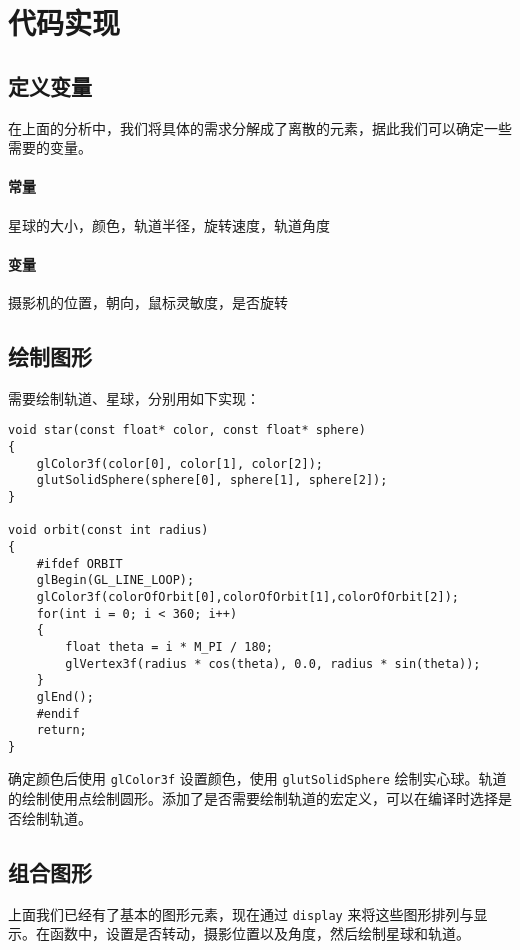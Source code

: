 \documentclass[12pt,hyperref,a4paper,UTF8]{ctexart}
\begin{document}
\section{代码实现}
\subsection{定义变量}
在上面的分析中，我们将具体的需求分解成了离散的元素，据此我们可以确定一些需要的变量。
\paragraph{常量}
星球的大小，颜色，轨道半径，旋转速度，轨道角度
\paragraph{变量}
摄影机的位置，朝向，鼠标灵敏度，是否旋转

\subsection{绘制图形}
需要绘制轨道、星球，分别用如下实现：
\begin{verbatim}
void star(const float* color, const float* sphere)
{
    glColor3f(color[0], color[1], color[2]);
    glutSolidSphere(sphere[0], sphere[1], sphere[2]);
}

void orbit(const int radius)
{
    #ifdef ORBIT
    glBegin(GL_LINE_LOOP);
    glColor3f(colorOfOrbit[0],colorOfOrbit[1],colorOfOrbit[2]);
    for(int i = 0; i < 360; i++)
    {
        float theta = i * M_PI / 180;
        glVertex3f(radius * cos(theta), 0.0, radius * sin(theta));
    }
    glEnd();
    #endif
    return;
}
\end{verbatim}

确定颜色后使用 \texttt{glColor3f} 设置颜色，使用 \texttt{glutSolidSphere} 绘制实心球。轨道的绘制使用点绘制圆形。添加了是否需要绘制轨道的宏定义，可以在编译时选择是否绘制轨道。

\subsection{组合图形}
上面我们已经有了基本的图形元素，现在通过 \texttt{display} 来将这些图形排列与显示。在函数中，设置是否转动，摄影位置以及角度，然后绘制星球和轨道。
\end{document}
